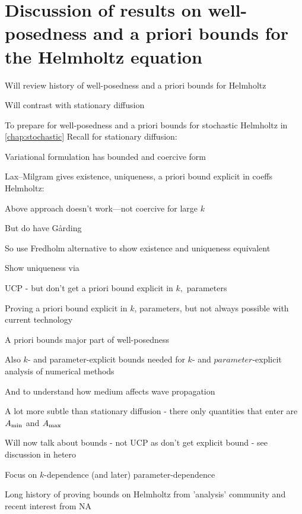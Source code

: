 \section{Discussion of results on well-posedness and a priori bounds for the Helmholtz equation}
\bit
\item Will review history of well-posedness and a priori bounds for Helmholtz
\item Will contrast with stationary diffusion
\item To prepare for well-posedness and a priori bounds for stochastic Helmholtz in \cref{chap:stochastic}
\eit
Recall for stationary diffusion:
\bit
\item Variational formulation has bounded and coercive form
\item Lax--Milgram gives existence, uniqueness, a priori bound explicit in coeffs
\eit
Helmholtz:
\bit
\item Above approach doesn't work---not coercive for large $k$
\item But do have G\r{a}rding
\item So use Fredholm alternative to show existence and uniqueness equivalent
\item Show uniqueness via
\bit
\item UCP - but don't get a priori bound explicit in $k,$ parameters
\item Proving a priori bound explicit in $k$, parameters, but not always possible with current technology
\eit
\item A priori bounds major part of well-posedness
\item Also $k$- and parameter-explicit bounds needed for $k$- and $parameter$-explicit analysis of numerical methods
\item And to understand how medium affects wave propagation
\item A lot more subtle than stationary diffusion - there only quantities that enter are $A_{\min}$ and $A_{\max}$
\eit
\bit
\item Will now talk about bounds - not UCP as don't get explicit bound - see discussion in hetero
\item Focus on $k$-dependence (and later) parameter-dependence
\item Long history of proving bounds on Helmholtz from 'analysis' community \cite{Bl:73,Va:75,BlKa:77,Bu:98,PeVe:99,PoVo:99a,PoVo:99b,CaPoVo:99,Bu:02,Be:03,Ca:12,CaLePa:12,NgVo:12,Sh:18} and recent interest from NA \cite{Me:95,CuFe:06,He:07,EsMe:12,Sp:14,FeLiLo:15,Ch:15,BaSpWu:16,BrGaPe:17,BaChGo:17,SaTo:18,OhVe:18,GrSa:18,GaSpWu:18,GrPeSp:19,MoSp:19}
